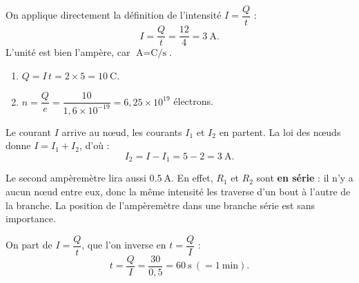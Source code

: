 \documentclass[11pt,a4paper]{article}
\begin{document}
\usetikzlibrary{babel}
\begin{corrige}
On applique directement la définition de l'intensité $I=\dfrac{Q}{t}$ :
\[ I=\frac{Q}{t}=\frac{12}{4}=\qty{3}{\ampere}. \]
L'unité est bien l'ampère, car $\si{\ampere}=\si{\coulomb\per\second}$.
\end{corrige}

\begin{corrige}
\begin{enumerate}[label=\alph*)]
  \item $Q=I\,t=2\times5=\qty{10}{\coulomb}$.
  \item $n=\dfrac{Q}{e}=\dfrac{10}{1{,}6\times10^{-19}}=6{,}25\times10^{19}$ électrons.
\end{enumerate}
\end{corrige}

\begin{corrige}
Le courant $I$ arrive au nœud, les courants $I_1$ et $I_2$ en partent. La loi des nœuds donne
$I=I_1+I_2$, d'où :
\[ I_2=I-I_1=5-2=\qty{3}{\ampere}. \]
\end{corrige}

\begin{corrige}
Le second ampèremètre lira aussi $\boxed{\qty{0.5}{\ampere}}$. En effet, $R_1$ et $R_2$ sont
\textbf{en série} : il n'y a aucun nœud entre eux, donc la même intensité les traverse d'un bout à
l'autre de la branche. La position de l'ampèremètre dans une branche série est sans importance.
\end{corrige}

\begin{corrige}
On part de $I=\dfrac{Q}{t}$, que l'on inverse en $t=\dfrac{Q}{I}$ :
\[ t=\frac{Q}{I}=\frac{30}{0{,}5}=\qty{60}{\second}\ (=\qty{1}{\minute}). \]
\end{corrige}
\end{document}
